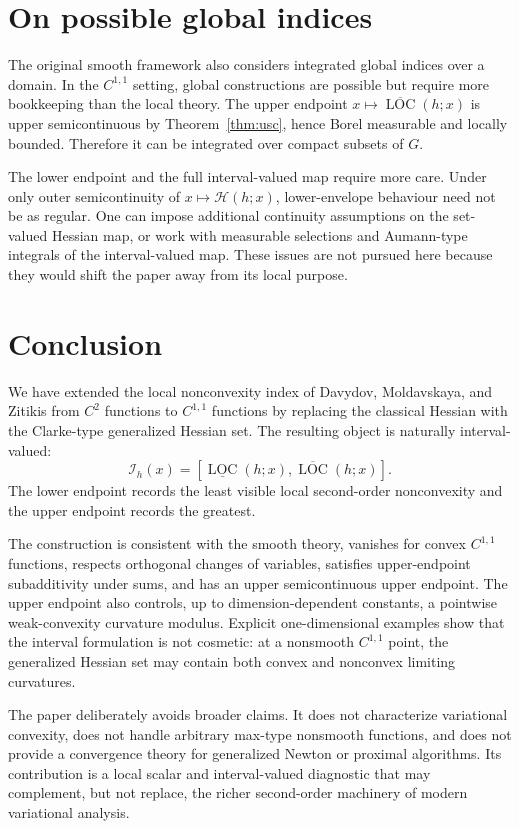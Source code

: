 \documentclass[11pt]{article}
\numberwithin{equation}{section}
\newcommand{\Hess}{\mathcal H}
\newcommand{\LOC}{\operatorname{LOC}}
\begin{document}
	\section{On possible global indices}
	
	The original smooth framework also considers integrated global indices over a domain. In the \(C^{1,1}\) setting, global constructions are possible but require more bookkeeping than the local theory. The upper endpoint \(x\mapsto\overline{\LOC}(h;x)\) is upper semicontinuous by Theorem~\ref{thm:usc}, hence Borel measurable and locally bounded. Therefore it can be integrated over compact subsets of \(G\).
	
	The lower endpoint and the full interval-valued map require more care. Under only outer semicontinuity of \(x\mapsto\Hess(h;x)\), lower-envelope behaviour need not be as regular. One can impose additional continuity assumptions on the set-valued Hessian map, or work with measurable selections and Aumann-type integrals of the interval-valued map. These issues are not pursued here because they would shift the paper away from its local purpose.
	
	\section{Conclusion}
	
	We have extended the local nonconvexity index of Davydov, Moldavskaya, and Zitikis from \(C^2\) functions to \(C^{1,1}\) functions by replacing the classical Hessian with the Clarke-type generalized Hessian set. The resulting object is naturally interval-valued:
	\[
	\mathcal I_h(x)
	=
	\left[
	\underline{\LOC}(h;x),
	\overline{\LOC}(h;x)
	\right].
	\]
	The lower endpoint records the least visible local second-order nonconvexity and the upper endpoint records the greatest.
	
	The construction is consistent with the smooth theory, vanishes for convex \(C^{1,1}\) functions, respects orthogonal changes of variables, satisfies upper-endpoint subadditivity under sums, and has an upper semicontinuous upper endpoint. The upper endpoint also controls, up to dimension-dependent constants, a pointwise weak-convexity curvature modulus. Explicit one-dimensional examples show that the interval formulation is not cosmetic: at a nonsmooth \(C^{1,1}\) point, the generalized Hessian set may contain both convex and nonconvex limiting curvatures.
	
	The paper deliberately avoids broader claims. It does not characterize variational convexity, does not handle arbitrary max-type nonsmooth functions, and does not provide a convergence theory for generalized Newton or proximal algorithms. Its contribution is a local scalar and interval-valued diagnostic that may complement, but not replace, the richer second-order machinery of modern variational analysis.
	
\end{document}
